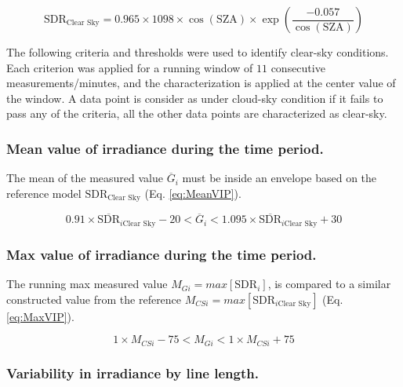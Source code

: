 \documentclass[preprint, 3p,
authoryear]{elsarticle} %
\begin{document}
\begin{equation}
\text{SDR}_\text{Clear Sky} = 0.965 \times 1098 \times \cos( \text{SZA} ) \times \exp \left( \frac{ - 0.057}{\cos(\text{SZA})} \right) \label{eq:ahau}
\end{equation}

The following criteria and thresholds were used to identify clear-sky
conditions. Each criterion was applied for a running window of \(11\)
consecutive measurements/minutes, and the characterization is applied at
the center value of the window. A data point is consider as under
cloud-sky condition if it fails to pass any of the criteria, all the
other data points are characterized as clear-sky.

\hypertarget{mean-value-of-irradiance-during-the-time-period.}{%
\subsubsection{Mean value of irradiance during the time
period.}\label{mean-value-of-irradiance-during-the-time-period.}}

The mean of the measured value \(\overline{G}_i\) must be inside an
envelope based on the reference model \(\text{SDR}_\text{Clear Sky}\)
(Eq. \ref{eq:MeanVIP}).

\begin{equation}
0.91 \times \overline{\text{SDR}}_{i\text{Clear Sky}} - 20
< \overline{G}_i <
1.095 \times \overline{\text{SDR}}_{i\text{Clear Sky}} + 30
\label{eq:MeanVIP}
\end{equation}

\hypertarget{max-value-of-irradiance-during-the-time-period.}{%
\subsubsection{Max value of irradiance during the time
period.}\label{max-value-of-irradiance-during-the-time-period.}}

The running max measured value \(M_{Gi} = max[\text{SDR}_{i}]\), is
compared to a similar constructed value from the reference
\(M_{CSi} = max[\text{SDR}_{i\text{Clear Sky}}]\) (Eq. \ref{eq:MaxVIP}).

\begin{equation}
1 \times M_{CSi} - 75
< M_{Gi} <
1 \times M_{CSi} + 75
\label{eq:MaxVIP}
\end{equation}

\hypertarget{variability-in-irradiance-by-line-length.}{%
\subsubsection{Variability in irradiance by line
length.}\label{variability-in-irradiance-by-line-length.}}
\end{document}
